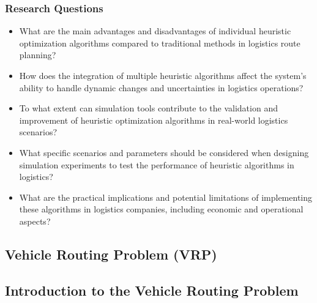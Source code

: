 \documentclass[
]{article}
\begin{document}
\subsubsection{Research Questions}
\begin{itemize}
    \item What are the main advantages and disadvantages of individual heuristic optimization algorithms compared to traditional methods in logistics route planning?
    \item How does the integration of multiple heuristic algorithms affect the system's ability to handle dynamic changes and uncertainties in logistics operations?
    \item To what extent can simulation tools contribute to the validation and improvement of heuristic optimization algorithms in real-world logistics scenarios?
    \item What specific scenarios and parameters should be considered when designing simulation experiments to test the performance of heuristic algorithms in logistics?
    \item What are the practical implications and potential limitations of implementing these algorithms in logistics companies, including economic and operational aspects?
\end{itemize}


\newpage




\hypertarget{vehicle-routing-problem}{%
  \subsection{Vehicle Routing Problem (VRP)}\label{vehicle-routing-problem}}


\hypertarget{introduction-to-the-vehicle-routing-problem}{%
  \subsection{Introduction to the Vehicle Routing Problem}\label{introduction-to-the-vehicle-routing-problem}}
\end{document}
